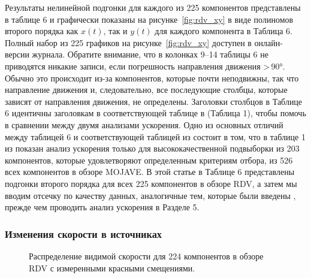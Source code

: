 Результаты нелинейной подгонки для каждого из 225 компонентов представлены в таблице 6 и графически
показаны на рисунке~\ref{fig:rdv_xy} в виде полиномов второго порядка как $x(t)$, так и $y(t)$ для
каждого компонента в Таблица 6. Полный набор из 225 графиков на рисунке~\ref{fig:rdv_xy} доступен в
онлайн-версии журнала. Обратите внимание, что в колонках 9--14 таблицы 6 не приводятся никакие
записи, если погрешность направления движения >\,\ang{90}. Обычно это происходит
из-за компонентов, которые почти неподвижны, так что направление движения и, следовательно, все
последующие столбцы, которые зависят от направления движения, не определены. Заголовки столбцов в
Таблице 6 идентичны заголовкам в соответствующей таблице в \cite{Homan_2009} (Таблица 1), чтобы
помочь в сравнении между двумя анализами ускорения. Одно из основных отличий между таблицей 6 и
соответствующей таблицей из \cite{Homan_2009} состоит в том, что в таблице 1 из \cite{Homan_2009}
показан анализ ускорения только для высококачественной подвыборки из 203 компонентов, которые
удовлетворяют определенным критериям отбора, из 526 всех компонентов в обзоре MOJAVE. В этой статье
в Таблице 6 представлены подгонки второго порядка для всех 225 компонентов в обзоре RDV, а затем
мы вводим отсечку по качеству данных, аналогичные тем, которые были введены \cite{Homan_2009},
прежде чем проводить анализ ускорения в Разделе 5.

\subsubsection{Изменения скорости в источниках}

\begin{figure}[]
 \caption{Распределение видимой скорости для 224 компонентов в обзоре RDV с измеренными красными
смещениями.}
 \label{fig:rdv_app_speed_distrib}
\end{figure}

